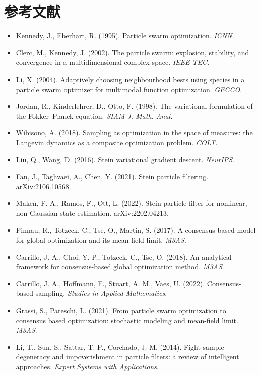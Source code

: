 \documentclass[a4paper,11pt]{article}
\begin{document}
\section*{参考文献}
\begin{itemize}
  \item Kennedy, J., Eberhart, R. (1995). Particle swarm optimization. \emph{ICNN}.
  \item Clerc, M., Kennedy, J. (2002). The particle swarm: explosion, stability, and convergence in a multidimensional complex space. \emph{IEEE TEC}.
  \item Li, X. (2004). Adaptively choosing neighbourhood bests using species in a particle swarm optimizer for multimodal function optimization. \emph{GECCO}.
  \item Jordan, R., Kinderlehrer, D., Otto, F. (1998). The variational formulation of the Fokker--Planck equation. \emph{SIAM J. Math. Anal.}
  \item Wibisono, A. (2018). Sampling as optimization in the space of measures: the Langevin dynamics as a composite optimization problem. \emph{COLT}.
  \item Liu, Q., Wang, D. (2016). Stein variational gradient descent. \emph{NeurIPS}.
  \item Fan, J., Taghvaei, A., Chen, Y. (2021). Stein particle filtering. arXiv:2106.10568.
  \item Maken, F. A., Ramos, F., Ott, L. (2022). Stein particle filter for nonlinear, non-Gaussian state estimation. arXiv:2202.04213.
  \item Pinnau, R., Totzeck, C., Tse, O., Martin, S. (2017). A consensus-based model for global optimization and its mean-field limit. \emph{M3AS}.
  \item Carrillo, J. A., Choi, Y.-P., Totzeck, C., Tse, O. (2018). An analytical framework for consensus-based global optimization method. \emph{M3AS}.
  \item Carrillo, J. A., Hoffmann, F., Stuart, A. M., Vaes, U. (2022). Consensus-based sampling. \emph{Studies in Applied Mathematics}.
  \item Grassi, S., Pareschi, L. (2021). From particle swarm optimization to consensus based optimization: stochastic modeling and mean-field limit. \emph{M3AS}.
  \item Li, T., Sun, S., Sattar, T. P., Corchado, J. M. (2014). Fight sample degeneracy and impoverishment in particle filters: a review of intelligent approaches. \emph{Expert Systems with Applications}.
\end{itemize}
\end{document}
